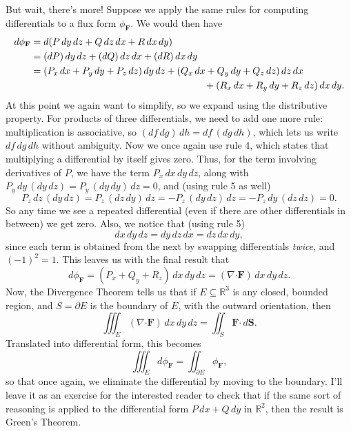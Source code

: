 \documentclass[letterpaper,12pt]{article}
\newcommand{\dotp}{\boldsymbol{\cdot}}
\newcommand{\R}{\mathbb{R}}
\newcommand{\F}{\mathbf{F}}
\begin{document}
But wait, there's more! Suppose we apply the same rules for computing differentials to a flux form $\phi_\F$. We would then have
\begin{align*}
d\phi_\F & = d(P\,dy\,dz+Q\,dz\,dx+R\,dx\,dy)\\
& = (dP)\,dy\,dz+(dQ)\,dz\,dx+(dR)\,dx\,dy\\
& = (P_x\,dx+P_y\,dy+P_z\,dz)\,dy\,dz+(Q_x\,dx+Q_y\,dy+Q_z\,dz)\,dz\,dx\\
&\hspace{2.5in}+(R_x\,dx+R_y\,dy+R_z\,dz)\,dx\,dy.
\end{align*}
At this point we again want to simplify, so we expand using the distributive property. For products of three differentials, we need to add one more rule: multiplication is associative, so $(df\,dg)\,dh = df\,(dg\,dh)$, which lets us write $df\,dg\,dh$ without ambiguity. Now we once again use rule 4, which states that multiplying a differential by itself gives zero. Thus, for the term involving derivatives of $P$, we have the term $P_x\,dx\,dy\,dz$, along with $P_y\,dy\,(dy\,dz) = P_y\,(dy\,dy)\,dz = 0$, and (using rule 5 as well)
\[
P_z\,dz\,(dy\,dz) = P_z\,(dz\,dy)\,dz = -P_z\,(dy\,dz)\,dz = -P_z\,dy\,(dz\,dz) = 0.
\]
So any time we see a repeated differential (even if there are other differentials in between) we get zero. Also, we notice that (using rule 5)
\[
dx\,dy\,dz = dy\,dz\,dx = dz\,dx\,dy,
\]
since each term is obtained from the next by swapping differentials {\em twice}, and $(-1)^2 = 1$. This leaves us with the final result that
\[
d\phi_\F = (P_x+Q_y+R_z)\,dx\,dy\,dz = (\nabla\dotp\F)\,dx\,dy\,dz.
\]
Now, the Divergence Theorem tells us that if $E\subseteq\R^3$ is any closed, bounded region, and $S = \partial E$ is the boundary of $E$, with the outward orientation, then
\[
\iiint_E (\nabla\dotp \F)\,dx\,dy\,dz = \iint_S \F\dotp\,d\mathbf{S}.
\]
Translated into differential form, this becomes
\[
\iiint_E d\phi_\F = \iint_{\partial E} \phi_\F,
\]
so that once again, we eliminate the differential by moving to the boundary. I'll leave it as an exercise for the interested reader to check that if the same sort of reasoning is applied to the differential form $P\,dx+Q\,dy$ in $\R^2$, then the result is Green's Theorem.
\end{document}

